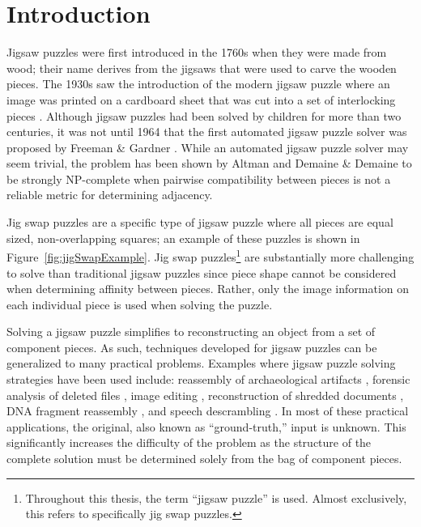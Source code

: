\chapter{Introduction}\label{sec:introduction}

Jigsaw puzzles were first introduced in the 1760s when they were made from wood; their name derives from the jigsaws that were used to carve the wooden pieces.   The 1930s saw the introduction of the modern jigsaw puzzle where an image was printed on a cardboard sheet that was cut into a set of interlocking pieces \cite{williams1990, williams2004}.  Although jigsaw puzzles had been solved by children for more than two centuries, it was not until 1964 that the first automated jigsaw puzzle solver was proposed by Freeman \& Gardner \cite{freeman1964}.  While an automated jigsaw puzzle solver may seem trivial, the problem has been shown by Altman \cite{altman1990} and Demaine \& Demaine \cite{demaine2007} to be strongly NP-complete when pairwise compatibility between pieces is not a reliable metric for determining adjacency.

Jig swap puzzles are a specific type of jigsaw puzzle where all pieces are equal sized, non-overlapping squares; an example of these puzzles is shown in Figure~\ref{fig:jigSwapExample}.  Jig swap puzzles\footnote{Throughout this thesis, the term ``jigsaw puzzle''  is used. Almost exclusively, this refers to specifically jig swap puzzles.} are substantially more challenging to solve than traditional jigsaw puzzles since piece shape cannot be considered when determining affinity between pieces.  Rather, only the image information on each individual piece is used when solving the puzzle.

Solving a jigsaw puzzle simplifies to reconstructing an object from a set of component pieces.  As such, techniques developed for jigsaw puzzles can be generalized to many practical problems.  Examples where jigsaw puzzle solving strategies have been used include: reassembly of archaeological artifacts \cite{brown2008, koller2006}, forensic analysis of deleted files \cite{garfinkel2010}, image editing \cite{cho2008}, reconstruction of shredded documents \cite{zhu2008}, DNA fragment reassembly \cite{marande2007}, and speech descrambling \cite{zhao2007}.  In most of these practical applications, the original, also known as ``ground-truth,'' input is unknown.  This significantly increases the difficulty of the problem as the structure of the complete solution must be determined solely from the bag of component pieces.

